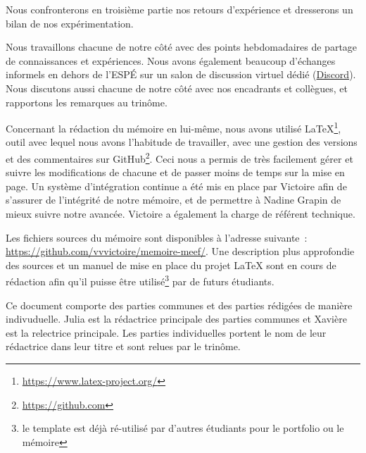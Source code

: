 Nous confronterons en troisième partie nos retours d'expérience et dresserons un bilan de nos expérimentation.

Nous travaillons chacune de notre côté avec des points hebdomadaires de partage de connaissances et expériences. Nous avons également beaucoup d’échanges informels en dehors de l’ESPÉ sur un salon de discussion virtuel dédié (\href{https://discordapp.com/}{Discord}). Nous discutons aussi chacune de notre côté avec nos encadrants et collègues, et rapportons les remarques au trinôme.

Concernant la rédaction du mémoire en lui-même, nous avons utilisé \LaTeX\footnote{\url{https://www.latex-project.org/}},
outil avec lequel nous avons l’habitude de travailler, avec une gestion des versions et des commentaires sur GitHub\footnote{\url{https://github.com}}. Ceci nous a permis de très facilement gérer et suivre les modifications de chacune et de passer moins de temps sur la mise en page. Un système d'intégration continue a été mis en place par Victoire afin de s'assurer de l'intégrité de notre mémoire, et de permettre à Nadine Grapin de mieux suivre notre avancée. Victoire a également la charge de référent technique. 

Les fichiers sources du mémoire sont disponibles à l'adresse suivante : \url{https://github.com/vvvictoire/memoire-meef/}. Une description plus approfondie des sources et un manuel de mise en place du projet \LaTeX{} sont en cours de rédaction afin qu'il puisse être utilisé\footnote{le template est déjà ré-utilisé par d'autres étudiants pour le portfolio ou le mémoire} par de futurs étudiants.

Ce document comporte des parties communes et des parties rédigées de manière indivuduelle. Julia est la rédactrice principale des parties communes et Xavière est la relectrice principale. Les parties individuelles portent le nom de leur rédactrice dans leur titre et sont relues par le trinôme.


